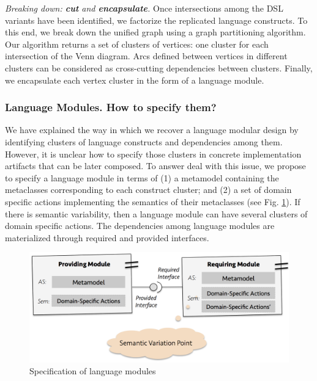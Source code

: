 \vspace{2mm}
\textit{Breaking down: \textbf{cut} and \textbf{encapsulate}.} Once intersections among the DSL variants have been identified, we factorize the replicated language constructs. To this end, we break down the unified graph using a graph partitioning algorithm. Our algorithm returns a set of clusters of vertices: one cluster for each intersection of the Venn diagram. Arcs defined between vertices in different clusters can be considered as cross-cutting dependencies between clusters. Finally, we encapsulate each vertex cluster in the form of a language module. 

\subsubsection{Language Modules. \textbf{How to specify them?}}

We have explained the way in which we recover a language modular design by identifying clusters of language constructs and dependencies among them. However, it is unclear how to specify those clusters in concrete implementation artifacts that can be later composed. To answer deal with this issue, we propose to specify a language module in terms of (1) a metamodel containing the metaclasses corresponding to each construct cluster; and (2) a set of domain specific actions implementing the semantics of their metaclasses (see Fig. \ref{fig:modulespec}). If there is semantic variability, then a language module can have several clusters of domain specific actions. The dependencies among language modules are materialized through required and provided interfaces. 

\begin{figure}[h!]
\centering
\includegraphics[width=1\linewidth]{images/language-modules-specification.png}
\caption{Specification of language modules}
\label{fig:modulespec}
\end{figure}



